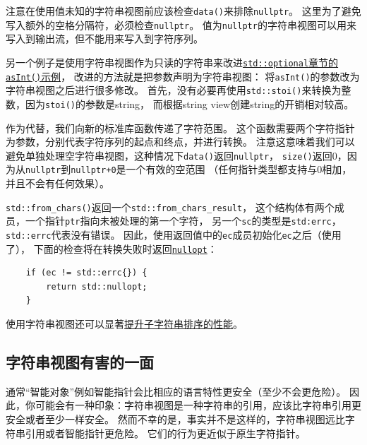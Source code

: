 注意在使用值未知的字符串视图前应该检查\texttt{data()}来排除\texttt{nullptr}。
这里为了避免写入额外的空格分隔符，必须检查\texttt{nullptr}。
值为\texttt{nullptr}的字符串视图可以用来写入到输出流，但不能用来写入到字符序列。

另一个例子是使用字符串视图作为只读的字符串来改进\hyperref[ch15.1.1]
{\texttt{std::optional}章节的\texttt{asInt()}示例}，
改进的方法就是把参数声明为字符串视图：\label{改进asInt}
将\texttt{asInt()}的参数改为字符串视图之后进行很多修改。
首先，没有必要再使用\texttt{std::stoi()}来转换为整数，因为\texttt{stoi()}的参数是string，
而根据string view创建string的开销相对较高。

作为代替，我们向新的标准库函数传递了字符范围。
这个函数需要两个字符指针为参数，分别代表字符序列的起点和终点，并进行转换。
注意这意味着我们可以避免单独处理空字符串视图，这种情况下\texttt{data()}返回\texttt{nullptr}，
\texttt{size()}返回0，因为从\texttt{nullptr}到\texttt{nullptr+0}是一个有效的空范围
（任何指针类型都支持与0相加，并且不会有任何效果）。

\texttt{std::from\_chars()}返回一个\texttt{std::from\_chars\_result}，
这个结构体有两个成员，一个指针\texttt{ptr}指向未被处理的第一个字符，
另一个\texttt{sc}的类型是\texttt{std:errc}，\texttt{std::errc{}}代表没有错误。
因此，使用返回值中的\texttt{ec}成员初始化\texttt{ec}之后（使用了），
下面的检查将在转换失败时返回\hyperref[nullopt]{\texttt{nullopt}}：
\begin{lstlisting}
    if (ec != std::errc{}) {
        return std::nullopt;
    }
\end{lstlisting}
使用字符串视图还可以显著\hyperref[ch22.1.2.1]{提升子字符串排序的性能}。

\subsection{字符串视图有害的一面}\label{ch19.3.1}
通常“智能对象”例如智能指针会比相应的语言特性更安全（至少不会更危险）。
因此，你可能会有一种印象：字符串视图是一种字符串的引用，应该比字符串引用更安全或者至少一样安全。
然而不幸的是，事实并不是这样的，字符串视图远比字符串引用或者智能指针更危险。
它们的行为更近似于原生字符指针。


